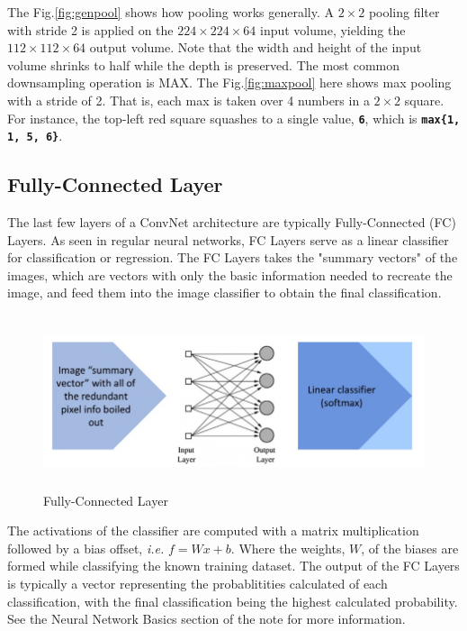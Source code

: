 \documentclass[twoside]{article}
\begin{document}
The Fig.\ref{fig:genpool} shows how pooling works generally. A $2\times2$ pooling filter with stride 2 is applied on the $224\times224\times64$ input volume, yielding the $112\times112\times64$ output volume. Note that the width and height of the input volume shrinks to half while the depth is preserved. The most common downsampling operation is MAX. The Fig.\ref{fig:maxpool} here shows max pooling with a stride of 2. That is, each max is taken over 4 numbers in a $2\times2$ square. For instance, the top-left red square squashes to a single value, \texttt{\textbf{6}}, which is \texttt{\textbf{max\{1, 1, 5, 6\}}}.

\subsection{Fully-Connected Layer}
The last few layers of a ConvNet architecture are typically Fully-Connected (FC) Layers. As seen in regular neural networks, FC Layers serve as a linear classifier for classification or regression. The FC Layers takes the "summary vectors" of the images, which are vectors with only the basic information needed to recreate the image, and feed them into the image classifier to obtain the final classification.

\begin{figure}[!htb]
\centering
\includegraphics[height = 2in]{pics/Fully-Connected Layer.jpg}
\caption{Fully-Connected Layer\cite{cs231n-website}}
\label{fig:fc layer}
\end{figure}

The activations of the classifier are computed with a matrix multiplication followed by a bias offset, \textit{i.e.} $f = Wx + b$. Where the weights, $W$, of the biases are formed while classifying the known training dataset. The output of the FC Layers is typically a vector representing the probablitities calculated of each classification, with the final classification being the highest calculated probability. See the Neural Network Basics section of the note for more information.
\end{document}
